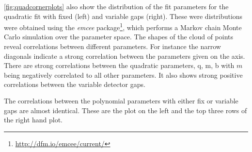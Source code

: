 
\cref{fig:quadcornerplots} also show the distribution of the fit parameters for the quadratic fit with fixed (left) and variable gaps (right). These were distributions were obtained using the \textit{emcee} \Python{} package\footnote{\href{http://dfm.io/emcee/current/}{http://dfm.io/emcee/current/}}, which performs a Markov chain Monte Carlo simulation over the parameter space.
The shapes of the cloud of points reveal correlations between different parameters.
For instance the narrow diagonals indicate a strong correlation between the parameters given on the axis.
There are strong correlations between the quadratic parameters, {q, m, b} with $m$ being negatively correlated to all other parameters.
It also shows strong positive correlations between the variable detector gaps.

The correlations between the polynomial parameters with either fix or variable gaps are almost identical. 
These are the plot on the left and the top three rows of the right hand plot.




